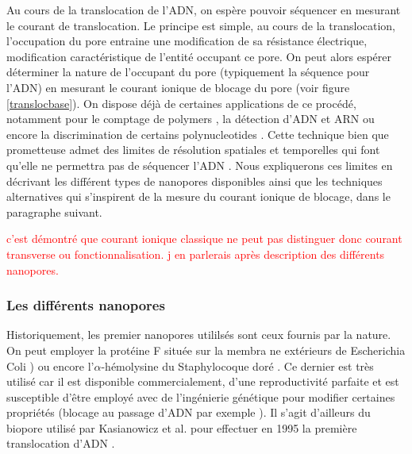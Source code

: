 \documentclass[a4paper,11pt]{article}
\begin{document}
Au cours de la translocation de l'ADN, on espère pouvoir séquencer en mesurant le courant de translocation. Le principe est simple, au cours de la translocation, l'occupation du pore entraine une modification de sa résistance électrique, modification caractéristique de l'entité occupant ce pore. On peut alors espérer déterminer la nature de l'occupant du pore (typiquement la séquence pour l'ADN) en mesurant le courant ionique de blocage du pore (voir figure \ref{translocbase}). On dispose déjà de certaines applications de ce procédé, notamment pour le comptage de polymers \cite{Bezrukov1994}, la détection d'ADN et ARN \cite{Kasianowicz1996} ou encore la discrimination de certains polynucleotides \cite{Akeson1999,Meller2000,Ashkenasy2005}. Cette technique bien que prometteuse admet des limites de résolution spatiales et temporelles qui font qu'elle ne permettra pas de séquencer l'ADN \cite{Branton2008}. Nous expliquerons ces limites en décrivant les différent types de nanopores disponibles ainsi que les techniques alternatives qui s'inspirent de la mesure du courant ionique de blocage, dans le paragraphe suivant.

\textcolor{red}{c'est démontré que courant ionique classique ne peut pas distinguer donc courant transverse ou fonctionnalisation. j en parlerais après description des différents nanopores.}

\subsubsection*{Les différents nanopores}


Historiquement, les premier nanopores utililsés sont ceux fournis par la nature. On peut employer la protéine F située sur la membra ne extérieurs de Escherichia Coli \cite{Danelon2006,Chimerel2008})
ou encore l'$\alpha$-hémolysine du Staphylocoque doré \cite{Bhakdi01121991}. Ce dernier est très utilisé car il est disponible commercialement, d'une reproductivité parfaite et est susceptible d'être employé avec de l'ingénierie génétique pour modifier certaines propriétés (blocage au passage d'ADN par exemple \cite{Howorka2001}). Il s'agit d'ailleurs du biopore utilisé par Kasianowicz et al. pour effectuer en 1995 la première translocation d'ADN \cite{Kasianowicz1996}.
\end{document}
